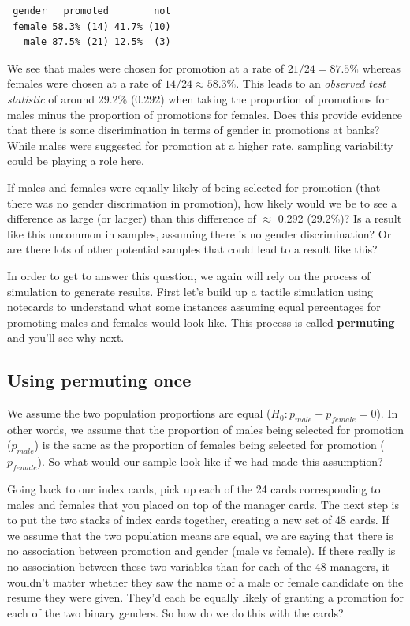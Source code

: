\documentclass[12pt, krantz2,]{krantz}
\begin{document}
\begin{verbatim}
 gender   promoted        not
 female 58.3% (14) 41.7% (10)
   male 87.5% (21) 12.5%  (3)
\end{verbatim}

We see that males were chosen for promotion at a rate of \(21/24 = 87.5\%\) whereas females were chosen at a rate of \(14/24 \approx 58.3\%\). This leads to an \emph{observed test statistic} of around 29.2\% (0.292) when taking the proportion of promotions for males minus the proportion of promotions for females. Does this provide evidence that there is some discrimination in terms of gender in promotions at banks? While males were suggested for promotion at a higher rate, sampling variability could be playing a role here.

If males and females were equally likely of being selected for promotion (that there was no gender discrimation in promotion), how likely would we be to see a difference as large (or larger) than this difference of \(\approx\) 0.292 (29.2\%)? Is a result like this uncommon in samples, assuming there is no gender discrimination? Or are there lots of other potential samples that could lead to a result like this?

In order to get to answer this question, we again will rely on the process of simulation to generate results. First let's build up a tactile simulation using notecards to understand what some instances assuming equal percentages for promoting males and females would look like. This process is called \textbf{permuting} and you'll see why next.

\hypertarget{using-permuting-once}{%
\subsection{Using permuting once}\label{using-permuting-once}}

We assume the two population proportions are equal (\(H_0: p_{male} - p_{female} = 0\)). In other words, we assume that the proportion of males being selected for promotion (\(p_{male}\)) is the same as the proportion of females being selected for promotion (\(p_{female}\)). So what would our sample look like if we had made this assumption?

Going back to our index cards, pick up each of the 24 cards corresponding to males and females that you placed on top of the manager cards. The next step is to put the two stacks of index cards together, creating a new set of 48 cards. If we assume that the two population means are equal, we are saying that there is no association between promotion and gender (male vs female). If there really is no association between these two variables than for each of the 48 managers, it wouldn't matter whether they saw the name of a male or female candidate on the resume they were given. They'd each be equally likely of granting a promotion for each of the two binary genders. So how do we do this with the cards?
\end{document}
